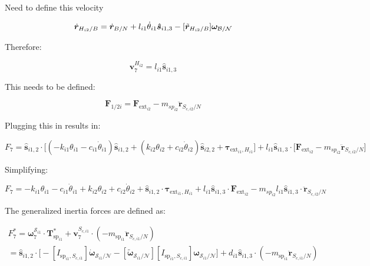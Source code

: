 \documentclass[paper]{aiaaNew}
\begin{document}
Need to define this velocity

\begin{equation}
\dot{\bm{r}}_{H_{{i2}}/B} = \dot{\bm r}_{B/N} + l_{i1} \dot{\theta}_{i1} \bm{\hat{s}}_{i1,3}  - [\tilde{\bm{r}}_{H_{{i2}}/B}] \bm \omega_{\cal{B/N}}
\end{equation}

Therefore:

\begin{equation}
\bm v^{H_{i2}}_{7} = l_{i1} \bm{\hat{s}}_{i1,3}
\end{equation}

This needs to be defined:

\begin{equation}
\bm F_{1/2i} = \bm F_{\text{ext}_{i2}}  - m_{sp_{i2}} \ddot{\bm{r}}_{S_{c,i2}/N} 
\end{equation}

Plugging this in results in:

\begin{equation}
F_{7} = \bm{\hat{s}}_{i1,2} \cdot \Big[ (-k_{i1} \theta_{i1} - c_{i1} \dot{\theta}_{i1})\bm{\hat{s}}_{i1,2} + (k_{i2} \theta_{i2} + c_{i2} \dot{\theta}_{i2})\bm{\hat{s}}_{i2,2} + \bm \tau_{\text{ext}_{i1},H_{i1}} \Big] + l_{i1} \bm{\hat{s}}_{i1,3} \cdot \Big[\bm F_{\text{ext}_{i2}}  - m_{sp_{i2}} \ddot{\bm{r}}_{S_{c,i2}/N} \Big]
\end{equation}

Simplifying:

\begin{equation}
F_{7} =  -k_{i1} \theta_{i1} - c_{i1} \dot{\theta}_{i1} + k_{i2} \theta_{i2} + c_{i2} \dot{\theta}_{i2} + \bm{\hat{s}}_{i1,2} \cdot \bm \tau_{\text{ext}_{i1},H_{i1}}  + l_{i1} \bm{\hat{s}}_{i1,3} \cdot \bm F_{\text{ext}_{i2}}  - m_{sp_{i2}} l_{i1} \bm{\hat{s}}_{i1,3} \cdot \ddot{\bm{r}}_{S_{c,i2}/N} 
\end{equation}

The generalized inertia forces are defined as: 

\begin{multline}
F^*_{7} = \bm \omega_{\textit{7}}^{\mathcal{S}_{i1}} \cdot \bm T^*_{\text{sp}_{i1}}  + \bm v^{S_{c,i1}}_{7} \cdot (-m_{\text{sp}_{i1}} \ddot{\bm{r}}_{S_{c,i1}/N}) \\
= \bm{\hat{s}}_{i1,2} \cdot \Big[-[I_{\text{sp}_{i1},S_{c,i1}}] \dot{\bm\omega}_{\mathcal{S}_{i1}/\mathcal{N}}  -[\tilde{\bm \omega}_{\mathcal{S}_{i1}/\mathcal{N}}] [I_{\text{sp}_{i1},S_{c,i1}}] \bm \omega_{\mathcal{S}_{i1}/\mathcal{N}} \Big] + d_{i1} \bm{\hat{s}}_{i1,3} \cdot (-m_{\text{sp}_{i1}} \ddot{\bm{r}}_{S_{c,i1}/N})
\end{multline}
\end{document}
